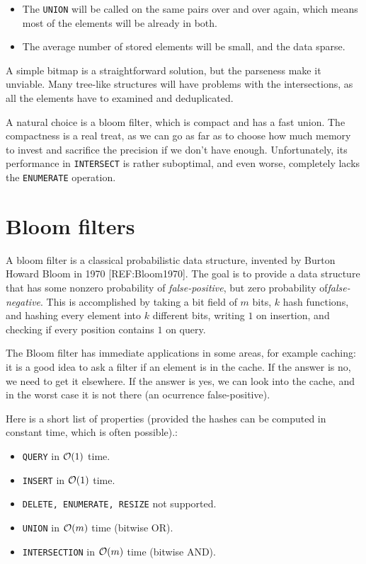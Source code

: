 \begin{itemize}
	\item The {\tt UNION} will be called on the same pairs over and over again,
		which means most of the elements will be already in both.
	\item The average number of stored elements will be small, and the data sparse.
\end{itemize}

A simple bitmap is a straightforward solution, but the parseness make it
unviable. Many tree-like structures will have problems with the intersections,
as all the elements have to examined and deduplicated.

A natural choice is a bloom filter, which is compact and has a fast union. The
compactness is a real treat, as we can go as far as to choose how much memory to
invest and sacrifice the precision if we don't have enough. Unfortunately, its
performance in {\tt INTERSECT} is rather suboptimal, and even worse, completely
lacks the {\tt ENUMERATE} operation.


\section{Bloom filters}

A bloom filter is a classical probabilistic data structure, invented by Burton
Howard Bloom in 1970 [REF:Bloom1970]. The goal is to provide a data structure
that has some nonzero probability of {\it false-positive}, but zero probability
of{\it false-negative}. This is accomplished by taking a bit field of $m$ bits,
$k$ hash functions, and hashing every element into $k$ different bits, writing
$1$ on insertion, and checking if every position contains $1$ on query.

The Bloom filter has immediate applications in some areas, for example caching:
it is a good idea to ask a filter if an element is in the cache. If the answer is
no, we need to get it elsewhere. If the answer is yes, we can look into the
cache, and in the worst case it is not there (an ocurrence false-positive).

Here is a short list of properties (provided the hashes can be computed in
constant time, which is often possible).:

\begin{itemize}
	\item {\tt QUERY} in $\mathcal{O}(1)$ time.
	\item {\tt INSERT} in $\mathcal{O}(1)$ time.
	\item {\tt DELETE, ENUMERATE, RESIZE} not supported.
	\item {\tt UNION} in $\mathcal{O}(m)$ time (bitwise OR).
	\item {\tt INTERSECTION} in $\mathcal{O}(m)$ time (bitwise AND).
\end{itemize}

